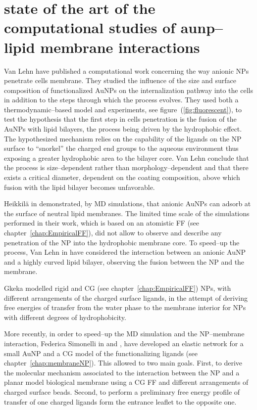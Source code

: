 \section{state of the art of the computational studies of aunp--lipid membrane interactions}
Van Lehn \etal have published a computational work \cite{VanLehn2013} concerning the way anionic \acp{NP} penetrate cells membrane. They studied the influence of the size and surface composition of functionalized \acp{AuNP} on the internalization pathway into the cells in addition to the steps through which the process evolves. They used both a thermodynamic--based model and experiments, see figure~(\ref{fig:fluorescent}), to test the hypothesis that the first step in cells penetration is the fusion of the \acp{AuNP} with lipid bilayers, the process being driven by the hydrophobic effect. The hypothesized mechanism relies on the capability of the ligands on the \ac{NP} surface to ``snorkel'' the charged end groups to the aqueous environment thus exposing a greater hydrophobic area to the bilayer core. Van Lehn \etal conclude that the process is size--dependent rather than morphology--dependent and that there exists a critical diameter, dependent on the coating composition, above which fusion with the lipid bilayer becomes unfavorable.

Heikkilä \etal in \cite{Heikkila2014} demonstrated, by \ac{MD} simulations, that anionic \acp{AuNP} can adsorb at the surface of neutral lipid membranes. The limited time scale of the simulations performed in their work, which is based on an atomistic \ac{FF} (see chapter~\ref{chap:EmpiricalFF}), did not allow to observe and describe any penetration of the \ac{NP} into the hydrophobic membrane core. To speed--up the process, Van Lehn \etal in \cite{VanLehn2014} have considered the interaction between an anionic \ac{AuNP} and a highly curved lipid bilayer, observing the fusion between the \ac{NP} and the membrane.

Gkeka \etal modelled rigid \cite{Gkeka2013} and \ac{CG} \cite{Gkeka2014} (see chapter~\ref{chap:EmpiricalFF}) \acp{NP}, with different arrangements of the charged surface ligands, in the attempt of deriving free energies of transfer from the water phase to the membrane interior for \acp{NP} with different degrees of hydrophobicity.

More recently, in order to speed--up the \ac{MD} simulation and the \ac{NP}--membrane interaction, Federica Simonelli \etal in \cite{simonelliThesis} and \cite{ourPaper}, have developed an elastic network for a small \ac{AuNP} and a \ac{CG} model of the functionalizing ligands (see chapter~\ref{chap:membraneNP}). This allowed to two main goals. First, to derive the molecular mechanism associated to the interaction between the \ac{NP} and a planar model biological membrane using a \ac{CG} \ac{FF} and different arrangements of charged surface beads. Second, to perform a preliminary free energy profile of transfer of one charged ligands form the entrance leaflet to the opposite one.


